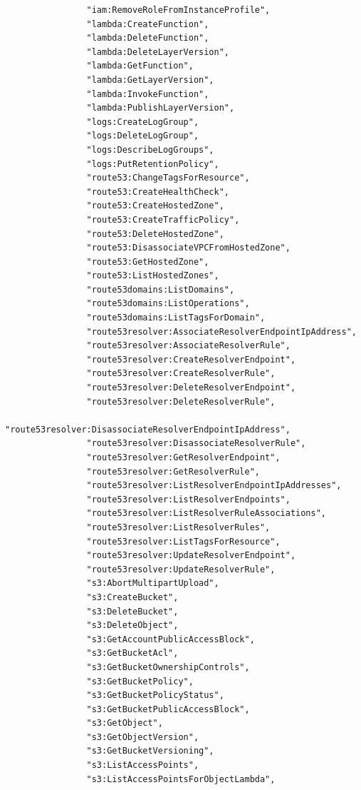 \begin{verbatim}
                "iam:RemoveRoleFromInstanceProfile",
                "lambda:CreateFunction",
                "lambda:DeleteFunction",
                "lambda:DeleteLayerVersion",
                "lambda:GetFunction",
                "lambda:GetLayerVersion",
                "lambda:InvokeFunction",
                "lambda:PublishLayerVersion",
                "logs:CreateLogGroup",
                "logs:DeleteLogGroup",
                "logs:DescribeLogGroups",
                "logs:PutRetentionPolicy",
                "route53:ChangeTagsForResource",
                "route53:CreateHealthCheck",
                "route53:CreateHostedZone",
                "route53:CreateTrafficPolicy",
                "route53:DeleteHostedZone",
                "route53:DisassociateVPCFromHostedZone",
                "route53:GetHostedZone",
                "route53:ListHostedZones",
                "route53domains:ListDomains",
                "route53domains:ListOperations",
                "route53domains:ListTagsForDomain",
                "route53resolver:AssociateResolverEndpointIpAddress",
                "route53resolver:AssociateResolverRule",
                "route53resolver:CreateResolverEndpoint",
                "route53resolver:CreateResolverRule",
                "route53resolver:DeleteResolverEndpoint",
                "route53resolver:DeleteResolverRule",
                "route53resolver:DisassociateResolverEndpointIpAddress",
                "route53resolver:DisassociateResolverRule",
                "route53resolver:GetResolverEndpoint",
                "route53resolver:GetResolverRule",
                "route53resolver:ListResolverEndpointIpAddresses",
                "route53resolver:ListResolverEndpoints",
                "route53resolver:ListResolverRuleAssociations",
                "route53resolver:ListResolverRules",
                "route53resolver:ListTagsForResource",
                "route53resolver:UpdateResolverEndpoint",
                "route53resolver:UpdateResolverRule",
                "s3:AbortMultipartUpload",
                "s3:CreateBucket",
                "s3:DeleteBucket",
                "s3:DeleteObject",
                "s3:GetAccountPublicAccessBlock",
                "s3:GetBucketAcl",
                "s3:GetBucketOwnershipControls",
                "s3:GetBucketPolicy",
                "s3:GetBucketPolicyStatus",
                "s3:GetBucketPublicAccessBlock",
                "s3:GetObject",
                "s3:GetObjectVersion",
                "s3:GetBucketVersioning",
                "s3:ListAccessPoints",
                "s3:ListAccessPointsForObjectLambda",

\end{verbatim}
